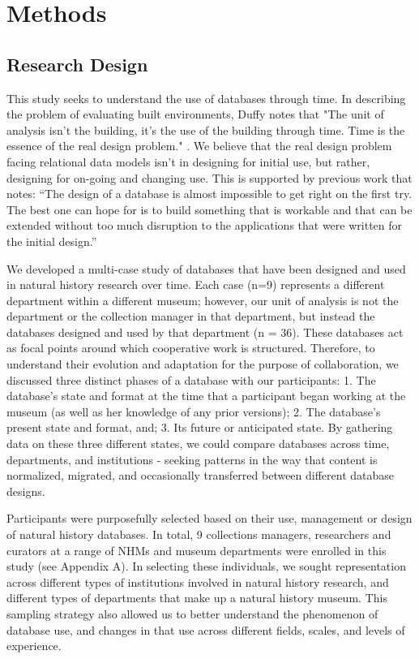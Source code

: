\section{Methods}

\subsection{Research Design}

This study seeks to understand the use of databases through time. In describing the problem of evaluating built environments, Duffy notes that "The unit of analysis isn't the building, it's the use of the building through time. Time is the essence of the real design problem." \cite{duffy1990measuring}. We believe that the real design problem facing relational data models isn't in designing for initial use, but rather, designing for on-going and changing use. This is supported by previous work that notes: “The design of a database is almost impossible to get right on the first try. The best one can hope for is to build something that is workable and that can be extended without too much disruption to the applications that were written for the initial design.” \cite{buneman2008curated}

We developed a multi-case study of databases that have been designed and used in natural history research over time. Each case (n=9) represents a different department within a different museum; however, our unit of analysis is not the department or the collection manager in that department, but instead the databases designed and used by that department (n = 36). These databases act as focal points around which cooperative work is structured. Therefore, to understand their evolution and adaptation for the purpose of collaboration, we discussed three distinct phases of a database with our participants: 1. The database's state and format at the time that a participant began working at the museum (as well as her knowledge of any prior versions); 2. The database's present state and format, and; 3. Its future or anticipated state. By gathering data on these three different states, we could  compare databases across time, departments, and institutions - seeking patterns in the way that content is normalized, migrated, and occasionally transferred between different database designs. 

Participants were purposefully selected based on their use, management or design of natural history databases. In total, 9 collections managers, researchers and curators at a range of NHMs and museum departments were enrolled in this study (see Appendix A). In selecting these individuals, we sought representation across different types of institutions involved in natural history research, and different types of departments that make up a natural history museum. This sampling strategy also allowed us to better understand the phenomenon of database use, and changes in that use across different fields, scales, and levels of experience.

